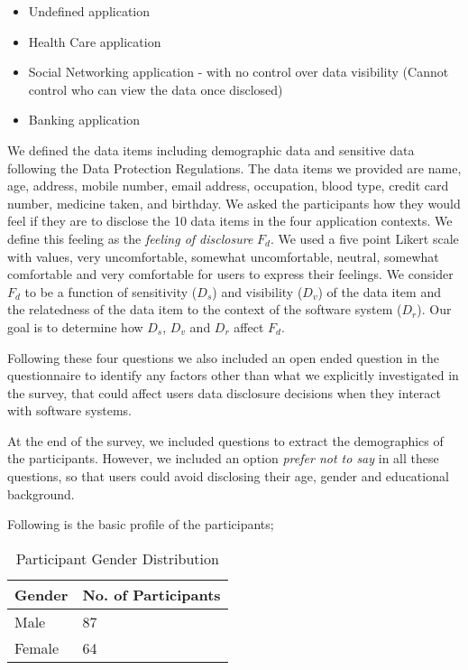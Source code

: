 \documentclass[10pt]{article}
\begin{document}
\begin{itemize}
\item Undefined application
\item Health Care application
\item Social Networking application - with no control over data visibility (Cannot control who can view the data once disclosed)
\item Banking application
\end{itemize}

We defined the data items including demographic data and sensitive data following the Data Protection Regulations. The data items we provided are name, age, address, mobile number, email address, occupation, blood type, credit card number, medicine taken, and birthday. We asked the participants how they would feel if they are to disclose the 10 data items in the four application contexts. We define this feeling as the \textit{feeling of disclosure} $F_d$. We used a five point Likert scale with values, very uncomfortable, somewhat uncomfortable, neutral, somewhat comfortable and very comfortable for users to express their feelings. We consider $F_d$ to be a function of sensitivity ($D_s$) and visibility ($D_v$) of the data item and the relatedness of the data item to the context of the software system ($D_r$). Our goal is to determine how $D_s$, $D_v$ and $D_r$ affect $F_d$.

Following these four questions we also included an open ended question in the questionnaire to identify any factors other than what we explicitly investigated in the survey, that could affect users data disclosure decisions when they interact with software systems. 

At the end of the survey, we included questions to extract the demographics of the participants. However, we included an option \textit{prefer not to say} in all these questions, so that users could avoid disclosing their age, gender and educational background.

Following is the basic profile of the participants;

\begin{center}
\begin{table}[htbp]
\caption{Participant Gender Distribution}
\begin{center}
\begin{tabular}{|l|l|} 
\hline
Gender & No. of Participants \\
\hline
Male & 87 \\
\hline
Female & 64 \\
\hline
\end{tabular}
\end{center}
\end{table}
\end{center} 
\end{document}
